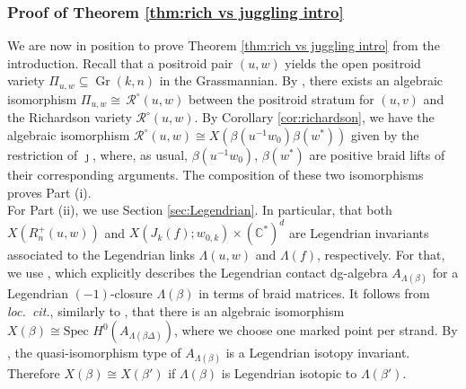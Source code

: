 \documentclass[10pt]{amsart}
\theoremstyle{plain}
\newtheorem{cor}[thm]{Corollary}
\theoremstyle{definition}
\newtheorem{remark}[thm]{Remark}
\theoremstyle{remark}
\numberwithin{equation}{section}
\newcommand{\La}{\Lambda}
\newcommand{\rich}[2]{\mathcal{R}^{\circ}\!(#2,#1)}
\DeclareMathOperator{\Gr}{Gr}
\begin{document}



\subsubsection{Proof of Theorem \ref{thm:rich vs juggling intro}}\label{sect:rich vs juggling} We are now in position to prove Theorem \ref{thm:rich vs juggling intro} from the introduction. Recall that a positroid pair $(u,w)$ yields the open positroid variety $\Pi_{u, w} \subseteq \Gr(k,n)$ in the Grassmannian. By \cite[Theorem 5.9]{KLS}, there exists an algebraic isomorphism $\Pi_{u, w} \cong\, \rich{w}{u}$ between the positroid stratum for $(u,v)$ and the Richardson variety $\rich{w}{u}$. By Corollary \ref{cor:richardson}, we have the algebraic isomorphism 
$\rich{w}{u} \cong X(\beta(u^{-1}w_0)\beta(w^*))$ given by the restriction of $\jmath$,
where, as usual, $\beta(u^{-1}w_0)$, %
$\beta(w^*)$
are positive braid lifts of their corresponding arguments. The composition of these two isomorphisms proves Part (i).\\

For Part (ii), we use Section \ref{sec:Legendrian}. In particular, that both $X(R_n^+(u,w))$ and $X(J_{k}(f); w_{0,k}) \times (\mathbb{C}^{*})^{d}$ are Legendrian invariants associated to the Legendrian links $\La(u,w)$ and $\La(f)$, respectively. For that, we use \cite[Section 5.1]{CasalsNg}, which explicitly describes the Legendrian contact dg-algebra $A_{\Lambda(\beta)}$ for a Legendrian $(-1)$-closure $\Lambda(\beta)$ in terms of braid matrices. It follows from \emph{loc.~cit.}, similarly to \cite[Section 2.6]{CGGS}, that there is an algebraic isomorphism $X(\beta)\cong\mbox{Spec } H^0(A_{\Lambda(\beta\Delta)})$, where we choose one marked point per strand. By \cite[Theorem 3.4]{Chekanov}, the quasi-isomorphism type of $A_{\Lambda(\beta)}$ is a Legendrian isotopy invariant. Therefore $X(\beta)\cong X(\beta')$ if $\La(\beta)$ is Legendrian isotopic to $\La(\beta')$.
\end{document}
